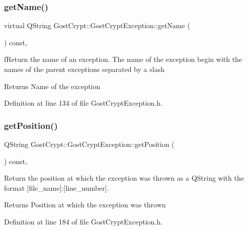 \subsubsection{\texorpdfstring{get\+Name()}{getName()}}
{\footnotesize\ttfamily virtual Q\+String Gost\+Crypt\+::\+Gost\+Crypt\+Exception\+::get\+Name (\begin{DoxyParamCaption}{ }\end{DoxyParamCaption}) const\hspace{0.3cm}{\ttfamily [inline]}, {\ttfamily [virtual]}}



f\+Return the name of an exception. The name of the exception begin with the names of the parent exceptions separated by a slash 

\begin{DoxyReturn}{Returns}
Name of the exception 
\end{DoxyReturn}


Definition at line 134 of file Gost\+Crypt\+Exception.\+h.

\mbox{\label{class_gost_crypt_1_1_gost_crypt_exception_a31b4dfdc5d4ad624887bd8fa3aa442b0}} 
\subsubsection{\texorpdfstring{get\+Position()}{getPosition()}}
{\footnotesize\ttfamily Q\+String Gost\+Crypt\+::\+Gost\+Crypt\+Exception\+::get\+Position (\begin{DoxyParamCaption}{ }\end{DoxyParamCaption}) const\hspace{0.3cm}{\ttfamily [inline]}, {\ttfamily [protected]}}



Return the position at which the exception was thrown as a Q\+String with the format \mbox{[}file\+\_\+name\mbox{]}\+:\mbox{[}line\+\_\+number\mbox{]}. 

\begin{DoxyReturn}{Returns}
Position at which the exception was thrown 
\end{DoxyReturn}


Definition at line 184 of file Gost\+Crypt\+Exception.\+h.

